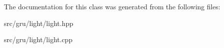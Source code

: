 \-The documentation for this class was generated from the following files\-:\begin{DoxyCompactItemize}
\item 
src/gru/light/light.\-hpp\item 
src/gru/light/light.\-cpp\end{DoxyCompactItemize}
